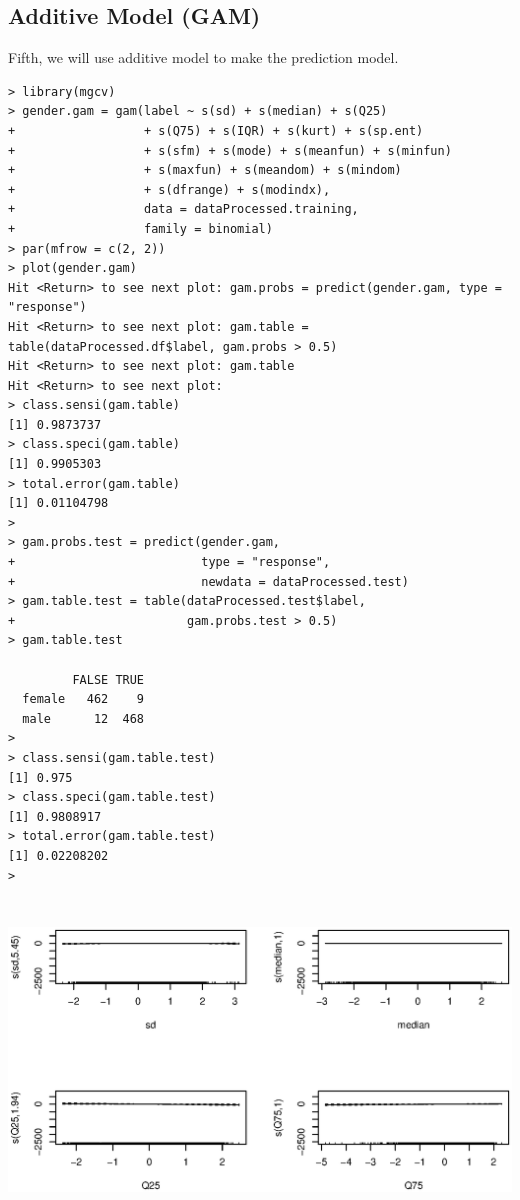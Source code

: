\documentclass{article}%
\begin{document}
\subsection{Additive Model (GAM)}
Fifth, we will use additive model to make the prediction model.
\begin{verbatim}> library(mgcv)
> gender.gam = gam(label ~ s(sd) + s(median) + s(Q25)
+                  + s(Q75) + s(IQR) + s(kurt) + s(sp.ent)
+                  + s(sfm) + s(mode) + s(meanfun) + s(minfun)
+                  + s(maxfun) + s(meandom) + s(mindom)
+                  + s(dfrange) + s(modindx),
+                  data = dataProcessed.training,
+                  family = binomial)
> par(mfrow = c(2, 2))
> plot(gender.gam)
Hit <Return> to see next plot: gam.probs = predict(gender.gam, type = "response")
Hit <Return> to see next plot: gam.table = table(dataProcessed.df$label, gam.probs > 0.5)
Hit <Return> to see next plot: gam.table
Hit <Return> to see next plot:
> class.sensi(gam.table)
[1] 0.9873737
> class.speci(gam.table)
[1] 0.9905303
> total.error(gam.table)
[1] 0.01104798
> 
> gam.probs.test = predict(gender.gam,
+                          type = "response",
+                          newdata = dataProcessed.test)
> gam.table.test = table(dataProcessed.test$label,
+                        gam.probs.test > 0.5)
> gam.table.test

         FALSE TRUE
  female   462    9
  male      12  468
>
> class.sensi(gam.table.test)
[1] 0.975
> class.speci(gam.table.test)
[1] 0.9808917
> total.error(gam.table.test)
[1] 0.02208202
> \end{verbatim}
\includegraphics[width = \textwidth, height = 8.5cm]{Rplot_gam_1.eps}
\end{document}
